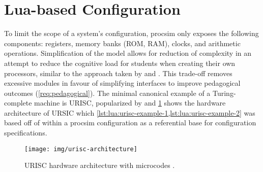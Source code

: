 

\section{Lua-based Configuration}

To limit the scope of a system's configuration, procsim only exposes the following components: registers, memory banks (ROM, RAM), clocks, and arithmetic operations. Simplification of the model allows for reduction of complexity in an attempt to reduce the cognitive load for students when creating their own processors, similar to the approach taken by \cite{Skrien2001} and \cite{Garcia2009}. This trade-off removes excessive modules in favour of simplifying interfaces to improve pedagogical outcomes (\cref{req:pedagogical}). The minimal canonical example of a Turing-complete machine is URISC, popularized by \cite{Mavaddat1988} and \cref{fig:urisc-architecture} shows the hardware architecture of URSIC which \cref{lst:lua:urisc-example-1,lst:lua:urisc-example-2} was based off of within a procsim configuration as a referential base for configuration specifications.

\begin{figure}[bp!]
    \centering
    \texttt{[image: img/urisc-architecture]}
    \caption{URISC hardware architecture with microcodes \cite{Mavaddat1988}.}
    \label{fig:urisc-architecture}
\end{figure}

\begin{listing}[hp!]
    \inputminted[escapeinside=||, lastline=42]{lua}{./listings/urisc.lua}
    \caption{Configuration of \cref{fig:urisc-architecture} for the URISC processor \cite{Mavaddat1988}.}
    \label{lst:lua:urisc-example-1}
\end{listing}

\begin{listing*}[hp!]
    \inputminted[escapeinside=||, firstline=45]{lua}{./listings/urisc.lua}
    \caption{(Continued) Configuration of \cref{fig:urisc-architecture} for the URISC processor \cite{Mavaddat1988}.}
    \label{lst:lua:urisc-example-2}
\end{listing*}

